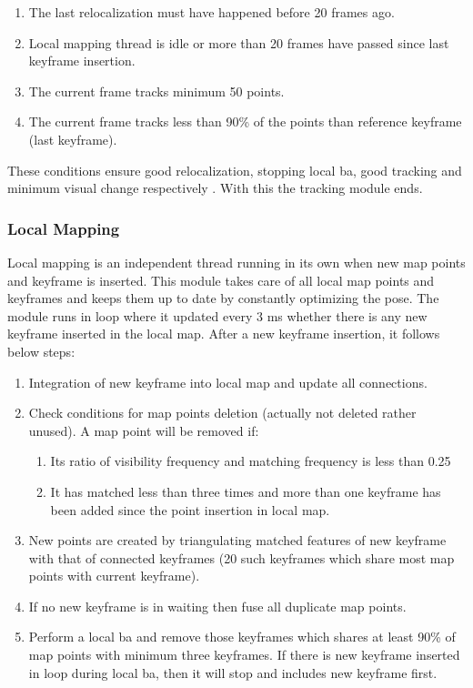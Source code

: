 \begin{enumerate}
	\item The last relocalization must have happened before 20 frames ago.
	\item Local mapping thread is idle or more than 20 frames have passed since last keyframe insertion.
	\item The current frame tracks minimum 50 points.
	\item The current frame tracks less than 90\% of the points than reference keyframe (last keyframe).
\end{enumerate}
These conditions ensure good relocalization, stopping local \acrshort{ba}, good tracking and minimum visual change respectively \cite{orbslam}. With this the tracking module ends. 

\subsubsection{Local Mapping} 
Local mapping is an independent thread running in its own when new map points and keyframe is inserted. This module takes care of all local map points and keyframes and keeps them up to date by constantly optimizing the pose. The module runs in loop where it updated every 3 ms whether there is any new keyframe inserted in the local map. After a new keyframe insertion, it follows below steps: 
\begin{enumerate}
	\item Integration of new keyframe into local map and update all connections. 
	\item Check conditions for map points deletion (actually not deleted rather unused). A map point will be removed if: 
	   \begin{enumerate}
		\item Its ratio of visibility frequency and matching frequency is less than 0.25
		\item It has matched less than three times and more than one keyframe has been added since the point insertion in local map.
	   \end{enumerate}
	\item New points are created by triangulating matched features of new keyframe with that of connected keyframes (20 such keyframes which share most map points with current keyframe).  
	\item If no new keyframe is in waiting then fuse all duplicate map points.
	\item Perform a local \acrshort{ba} and remove those keyframes which shares at least 90\% of map points with minimum three keyframes. If there is new keyframe inserted in loop during local \acrshort{ba}, then it will stop and includes new keyframe first.
\end{enumerate}

